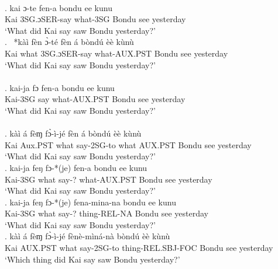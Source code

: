 \documentclass{assets/fieldnotes}
\begin{document}
\\
\exg. kai ɔ-te fen-a bondu ee kunu   \\
Kai  3SG.ɔSER-say what-3SG Bondu see yesterday\\
`What did Kai say saw Bondu yesterday?'\\ 

\exg. \ *kàì fèn ɔ̀-té fèn á bòndú èè kùnù   \\
Kai what 3SG.ɔSER-say what-AUX.PST Bondu see yesterday\\
`What did Kai say saw Bondu yesterday?'\\ 


\\

\exg. kai-ja fɔ fen-a bondu ee kunu   \\
Kai-3SG say what-AUX.PST Bondu see yesterday\\
`What did Kai say saw Bondu yesterday?'\\ 

\\


\exg. kàì á fèɱ fɔ̀-ì-jé fèn á bòndú èè kùnù   \\
Kai Aux.PST what say-2SG-to what AUX.PST Bondu see yesterday\\
`What did Kai say saw Bondu yesterday?'\\ 

\exg. kai-ja feŋ fɔ-*(je) fen-a bondu ee kunu   \\
Kai-3SG what say-? what-AUX.PST Bondu see yesterday\\
`What did Kai say saw Bondu yesterday?'\\ 

\exg. kai-ja feŋ fɔ-*(je) fena-mina-na bondu ee kunu   \\
Kai-3SG what say-? thing-REL-NA Bondu see yesterday\\
`What did Kai say saw Bondu yesterday?'\\ 

\exg. kàì á fèɱ fɔ̀-ì-jé fènè-mìná-nà bòndú èè kùnù\\
Kai AUX.PST what say-2SG-to thing-REL.SBJ-FOC Bondu see yesterday\\
`Which thing did Kai say saw Bondu yesterday?'\\ 
\end{document}
